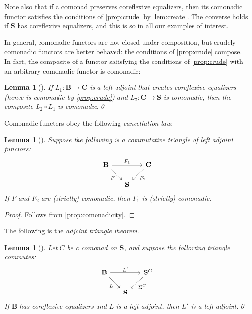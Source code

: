 \documentclass[11pt, oneside, article]{memoir}
\theoremstyle{plain}
\newtheorem{lemma}[theorem]{Lemma}
\theoremstyle{definition}
\theoremstyle{remark}
\newcommand{\cat}[1]{\mathbf{#1}}
\newcommand{\CoalgOn}[2]{{#2}^{#1}}
\newcommand{\CoalgS}[1]{\CoalgOn{#1}{\bS}}
\newcommand{\carr}{\Sigma}
\newcommand{\car}[1]{\carr^{#1}}
\newcommand{\carC}{\car{\cC}}
\newcommand{\cmnd}[1]{{#1}}
\newcommand{\cC}{\cmnd{C}}
\newcommand{\bB}{\cat{B}}
\newcommand{\bC}{\cat{C}}
\newcommand{\bS}{\cat{S}}
\newcommand{\CS}{\CoalgS{\cC}}
\begin{document}
Note also that if a comonad preserves coreflexive equalizers, then its
comonadic functor satisfies the conditions of \cref{prop:crude} by
\cref{lem:create}. The converse holds if $\bS$ has coreflexive
equalizers, and this is so in all our examples of interest.

In general, comonadic functors are not closed under composition, but
crudely comonadic functors are better behaved: the conditions of
\cref{prop:crude} compose. In fact, the composite of a functor
satisfying the conditions of \cref{prop:crude} with an arbitrary
comonadic functor is comonadic:

\begin{lemma}[{\cite[Proposition 3.5.1]{barr-wells}}]\label{lem:crudecompose}
  If $L_1 \colon \bB \to \bC$ is a left adjoint that creates
  coreflexive equalizers (hence is comonadic by \cref{prop:crude}) and
  $L_2 \colon \bC \to \bS$ is comonadic, then the composite
  $L_2 \circ L_1$ is comonadic.\qed
\end{lemma}

Comonadic functors obey the following \emph{cancellation law}:

\begin{lemma}[{\cite{bourn}}]\label{lem:cancel}
  Suppose the following is a commutative triangle of left adjoint
  functors:
  \[\begin{tikzcd}[column sep=15pt, row sep=15pt]
      {\bB} && {\bC} \\
      & {\bS}
      \arrow["F_1", from=1-1, to=1-3]
      \arrow["{F}"', from=1-1, to=2-2]
      \arrow["{F_2}", from=1-3, to=2-2]
    \end{tikzcd}\] If $F$ and $F_2$ are (strictly) comonadic, then
  $F_1$ is (strictly) comonadic.
\end{lemma}
\begin{proof}
  Follows from \cref{prop:comonadicity}.
\end{proof}

The following is the \emph{adjoint triangle theorem}.

\begin{lemma}[{\cite{dubuc:triangle}}]\label{lem:lifting}
  Let $\cC$ be a comonad on $\bS$, and suppose the following triangle
  commutes:
  \[\begin{tikzcd}[column sep=15pt, row sep=15pt]
      {\bB} && \CS \\
      & \bS
      \arrow["{L'}", from=1-1, to=1-3]
      \arrow["L"', from=1-1, to=2-2]
      \arrow["\carC", from=1-3, to=2-2]
    \end{tikzcd}\]
  If $\bB$ has coreflexive equalizers and $L$ is a left adjoint,
  then $L'$ is a left adjoint.\qed
\end{lemma}
\end{document}
